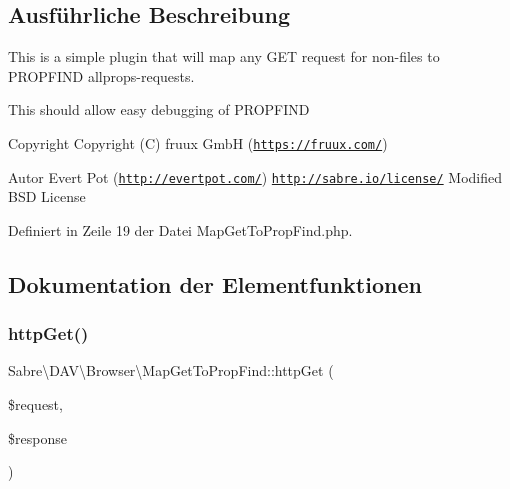 \subsection{Ausführliche Beschreibung}
This is a simple plugin that will map any G\+ET request for non-\/files to P\+R\+O\+P\+F\+I\+ND allprops-\/requests.

This should allow easy debugging of P\+R\+O\+P\+F\+I\+ND

\begin{DoxyCopyright}{Copyright}
Copyright (C) fruux GmbH (\href{https://fruux.com/}{\tt https\+://fruux.\+com/}) 
\end{DoxyCopyright}
\begin{DoxyAuthor}{Autor}
Evert Pot (\href{http://evertpot.com/}{\tt http\+://evertpot.\+com/})  \href{http://sabre.io/license/}{\tt http\+://sabre.\+io/license/} Modified B\+SD License 
\end{DoxyAuthor}


Definiert in Zeile 19 der Datei Map\+Get\+To\+Prop\+Find.\+php.



\subsection{Dokumentation der Elementfunktionen}
\mbox{\label{class_sabre_1_1_d_a_v_1_1_browser_1_1_map_get_to_prop_find_a3d55cafd618f975cb9c00bf4b93d6801}} 
\subsubsection{\texorpdfstring{http\+Get()}{httpGet()}}
{\footnotesize\ttfamily Sabre\textbackslash{}\+D\+A\+V\textbackslash{}\+Browser\textbackslash{}\+Map\+Get\+To\+Prop\+Find\+::http\+Get (\begin{DoxyParamCaption}\item[{\mbox{\hyperlink{interface_sabre_1_1_h_t_t_p_1_1_request_interface}{Request\+Interface}}}]{\$request,  }\item[{\mbox{\hyperlink{interface_sabre_1_1_h_t_t_p_1_1_response_interface}{Response\+Interface}}}]{\$response }\end{DoxyParamCaption})}

